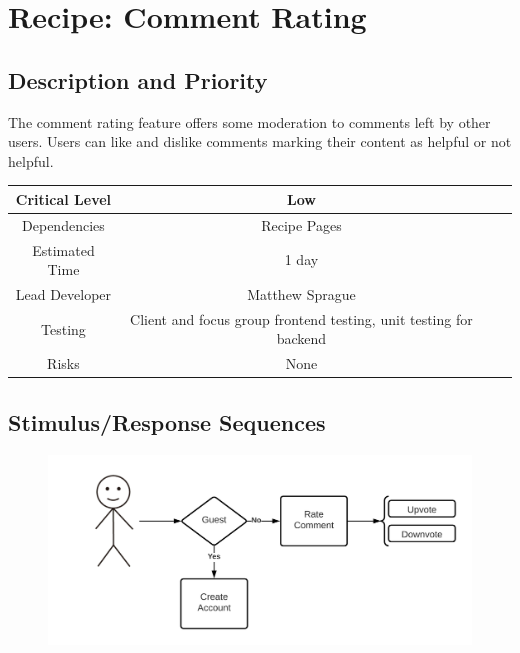 \documentclass{scrreprt}
\begin{document}
\section{Recipe: Comment Rating}

\subsection{Description and Priority}

The comment rating feature offers some moderation to comments left by other users. Users can like and dislike comments marking their content as helpful or not helpful.

\begin{center}
    \begin{tabular}{| c | c | c | c |}
        \hline
        Critical Level & Low                                                               \\
        \hline
        Dependencies   & Recipe Pages                                                      \\
        \hline
        Estimated Time & 1 day                                                             \\
        \hline
        Lead Developer & Matthew Sprague                                                   \\
        \hline
        Testing        & Client and focus group frontend testing, unit testing for backend \\
        \hline
        Risks          & None                                                              \\
        \hline
    \end{tabular}
\end{center}

\subsection{Stimulus/Response Sequences}

\begin{figure}[H]\centering
    \includegraphics[width=\columnwidth]{FlowCharts/Recipe-Comment-Rating.png}
\end{figure}
\end{document}
